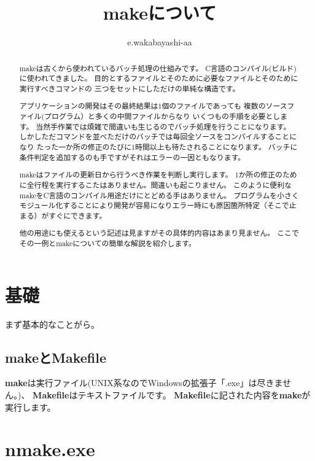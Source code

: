 \documentclass[dvipdfmx]{jsarticle}
\author{e.wakabayashi-aa}
\title{makeについて}
\begin{document}
\maketitle

\begin{abstract}
makeは古くから使われているバッチ処理の仕組みです。
C言語のコンパイル(ビルド)に使われてきました。
目的とするファイルとそのために必要なファイルとそのために実行すべきコマンドの
三つをセットにしただけの単純な構造です。\par
アプリケーションの開発はその最終結果は1個のファイルであっても
複数のソースファイル(プログラム）と多くの中間ファイルからなり
いくつもの手順を必要とします。
当然手作業では煩雑で間違いも生じるのでバッチ処理を行うことになります。
しかしただコマンドを並べただけのバッチでは毎回全ソースをコンパイルすることになり
たった一か所の修正のたびに1時間以上も待たされることになります。
バッチに条件判定を追加するのも手ですがそれはエラーの一因ともなります。\par
makeはファイルの更新日から行うべき作業を判断し実行します。
1か所の修正のために全行程を実行するこたはありません。間違いも起こりません。
このように便利なmakeをC言語のコンパイル用途だけにとどめる手はありません。
プログラムを小さくモジュール化することにより開発が容易になりエラー時にも原因箇所特定（そこで止まる）がすぐにできます。\par
他の用途にも使えるという記述は見ますがその具体的内容はあまり見ません。
ここでその一例とmakeについての簡単な解説を紹介します。

\end{abstract}


\newpage

\section{基礎}
まず基本的なことがら。


\subsection{makeとMakefile}
\textbf{make}は実行ファイル(UNIX系なのでWindowsの拡張子「.exe」は尽きません。)、
\textbf{Makefile}はテキストファイルです。
\textbf{Makefile}に記された内容を\textbf{make}が実行します。


\section{nmake.exe}
\end{document}
